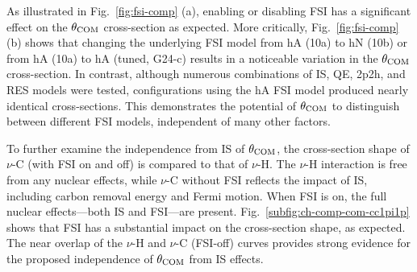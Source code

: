 As illustrated in Fig.~\ref{fig:fsi-comp} (a), enabling or disabling FSI has a significant effect on the $\theta_{\textrm{COM}}$ cross-section as expected.
More critically, Fig.~\ref{fig:fsi-comp} (b) shows that changing the underlying FSI model from hA (10a) to hN (10b) or from hA (10a) to hA (tuned, G24-c) results in a noticeable variation in the $\theta_{\textrm{COM}}$ cross-section. 
In contrast, although numerous combinations of IS, QE, 2p2h, and RES models were tested, configurations using the hA FSI model produced nearly identical cross-sections.
This demonstrates the potential of $\theta_{\textrm{COM}}$ to distinguish between different FSI models, independent of many other factors.


To further examine the independence from IS of $\theta_{\textrm{COM}}$, the cross-section shape of $\nu$-C (with FSI on and off) is compared to that of $\nu$-H. 
The $\nu$-H interaction is free from any nuclear effects, while $\nu$-C without FSI reflects the impact of IS, including carbon removal energy and Fermi motion. 
When FSI is on, the full nuclear effects—both IS and FSI—are present. 
Fig.~\ref{subfig:ch-comp-com-cc1pi1p} shows that FSI has a substantial impact on the cross-section shape, as expected. 
The near overlap of the $\nu$-H and $\nu$-C (FSI-off) curves provides strong evidence for the proposed independence of $\theta_{\textrm{COM}}$ from IS effects.

